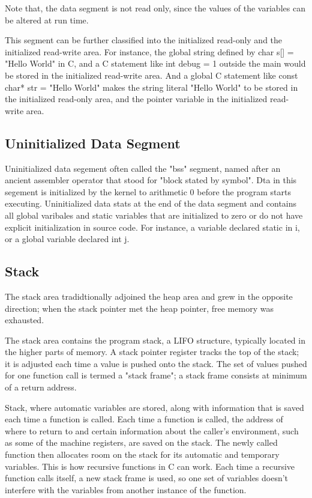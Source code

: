 \documentclass[a5paper,pagesize,10pt,bibtotoc,pointlessnumbers, normalheadings,DIV=9,twoside=false]{scrbook}
\begin{document}
Note that, the data segment is not read only, since the values of the variables can be altered 
at run time.

This segment can be further classified into the initialized read-only and the initialized
read-write area.
For instance, the global string defined by char s[] = "Hello World" in C, and a C statement like 
int debug = 1 outside the main would be stored in the initialized read-write area.
And a global C statement like const char* str = "Hello World" makes the string literal "Hello World" 
to be stored in the initialized read-only area, and the pointer variable in the initialized 
read-write area.  

\subsection{Uninitialized Data Segment}
Uninitialized data segement often called the "bss" segment, named after an ancient assembler operator 
that stood for "block stated by symbol". 
Dta in this segement is initialized by the kernel to arithmetic 0 before the program starts executing.
Uninitialized data stats at the end of the data segment and contains all global varibales and static 
variables that are initialized to zero or do not have explicit initialization in source code.
For instance, a variable declared static in i, or a global variable declared int j.


\subsection{Stack}
The stack area tradidtionally adjoined the heap area and grew in the opposite direction; 
when the stack pointer met the heap pointer, free memory was exhausted.

The stack area contains the program stack, a LIFO structure, typically located in the higher parts of memory.
A stack pointer register tracks the top of the stack; it is adjusted each time a value is 
pushed onto the stack. 
The set of values pushed for one function call is termed a "stack frame"; a stack frame consists 
at minimum of a return address.

Stack, where automatic variables are stored, along with information that is saved each time a function 
is called.
Each time a function is called, the address of where to return to and certain information about 
the caller's environment, such as some of the machine registers, are saved on the stack. 
The newly called function then allocates room on the stack for its automatic and temporary 
variables. 
This is how recursive functions in C can work. 
Each time a recursive function calls itself, a new stack frame is used, so one set of variables 
doesn't interfere with the variables from another instance of the function.
\end{document}
